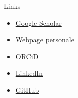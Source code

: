 \documentclass{resume} %
\begin{document}
\begin{rSection}{Links}
\begin{minipage}{0.5\textwidth}
\begin{itemize}
    \item \href{https://scholar.google.com/citations?user=5KPh-oUAAAAJ&hl=en}{Google Scholar}
    \item \href{https://emilio-berti.github.io/}{Webpage personale}
    \item \href{https://orcid.org/0000-0001-9286-011X}{ORCiD}
\end{itemize}
\end{minipage}
\begin{minipage}{0.5\textwidth}
\begin{itemize}
    \item \href{https://www.linkedin.com/in/emilio-berti-55a348146}{LinkedIn}
    \item \href{https://github.com/emilio-berti}{GitHub}
\end{itemize}
\end{minipage}
\end{rSection}
\end{document}
